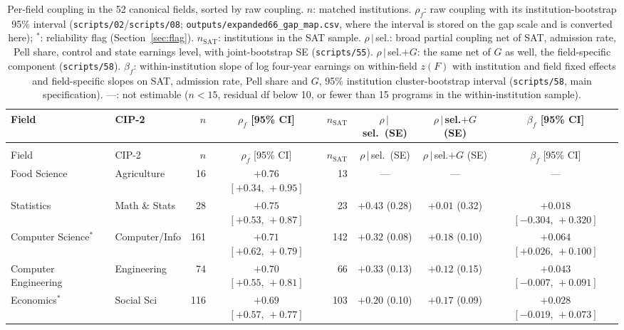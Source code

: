 \documentclass[11pt]{article}
\newcommand{\scr}[1]{\texttt{scripts/#1}}
\begin{document}
{\scriptsize
\setlength{\tabcolsep}{1.5pt}
\begin{longtable}{@{}>{\raggedright\arraybackslash}p{3.2cm}>{\raggedright\arraybackslash}p{1.9cm}rcrccc@{}}
\caption{Per-field coupling in the 52 canonical fields, sorted by raw coupling. $n$: matched institutions.
$\rho_f$: raw coupling with its institution-bootstrap 95\% interval (\scr{02}/\scr{08};
\texttt{outputs/expanded66\_gap\_map.csv}, where the interval is stored on the gap scale and is converted
here); $^{*}$: reliability flag (Section~\ref{sec:flag}). $n_{\text{SAT}}$: institutions in the SAT sample. $\rho\,|\,$sel.: broad partial
coupling net of SAT, admission rate, Pell share, control and state earnings level, with joint-bootstrap SE
(\scr{55}). $\rho\,|\,$sel.$+G$: the same net of $G$ as well, the field-specific component (\scr{58}). $\beta_f$:
within-institution slope of log four-year earnings on within-field $z(F)$ with institution and field fixed
effects and field-specific slopes on SAT, admission rate, Pell share and $G$, 95\% institution cluster-bootstrap
interval (\scr{58}, main specification). ---: not estimable ($n<15$, residual df below 10, or fewer than 15
programs in the within-institution sample).}\label{tab:fields}\\
\toprule
Field & CIP-2 & $n$ & $\rho_f$ [95\% CI] & $n_{\text{SAT}}$ & $\rho\,|\,$sel.\ (SE) & $\rho\,|\,$sel.$+G$ (SE) & $\beta_f$ [95\% CI] \\
\midrule
\endfirsthead
\multicolumn{8}{@{}l}{\small Table~\ref{tab:fields} (continued)}\\
\toprule
Field & CIP-2 & $n$ & $\rho_f$ [95\% CI] & $n_{\text{SAT}}$ & $\rho\,|\,$sel.\ (SE) & $\rho\,|\,$sel.$+G$ (SE) & $\beta_f$ [95\% CI] \\
\midrule
\endhead
\bottomrule
\endfoot
Food Science & Agriculture & 16 & ${+}0.76$ $[{+}0.34,\,{+}0.95]$ & 13 & --- & --- & --- \\
Statistics & Math \& Stats & 28 & ${+}0.75$ $[{+}0.53,\,{+}0.87]$ & 23 & ${+}0.43$ (0.28) & ${+}0.01$ (0.32) & ${+}0.018$ $[{-}0.304,\,{+}0.320]$ \\
Computer Science$^{*}$ & Computer/\allowbreak Info & 161 & ${+}0.71$ $[{+}0.62,\,{+}0.79]$ & 142 & ${+}0.32$ (0.08) & ${+}0.18$ (0.10) & ${+}0.064$ $[{+}0.026,\,{+}0.100]$ \\
Computer Engineering & Engineering & 74 & ${+}0.70$ $[{+}0.55,\,{+}0.81]$ & 66 & ${+}0.33$ (0.13) & ${+}0.12$ (0.15) & ${+}0.043$ $[{-}0.007,\,{+}0.091]$ \\
Economics$^{*}$ & Social Sci & 116 & ${+}0.69$ $[{+}0.57,\,{+}0.77]$ & 103 & ${+}0.20$ (0.10) & ${+}0.17$ (0.09) & ${+}0.028$ $[{-}0.019,\,{+}0.073]$ \\

\end{longtable}}
\end{document}
